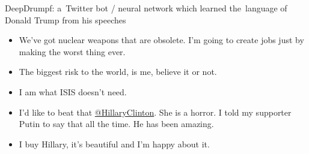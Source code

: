 \documentclass{beamer}
\begin{document}
  {

    \begin{frame}{DeepDrumpf: a~Twitter bot / neural network which learned the~language of Donald Trump from his speeches}
      \pause

      \vskip 5.25cm
      \begin{itemize}[<+- | alert@+>]
          \tiny
        \item We've got nuclear weapons that are obsolete.
          I'm going to create jobs just by making the worst thing ever.
        \item The biggest risk to the world, is me, believe it or not.
        \item I am what ISIS doesn't need.
        \item I'd like to beat that \href{https://twitter.com/hillaryclinton}{@HillaryClinton}.
          She is a horror.
          I told my supporter Putin to say that all the time.
          He has been amazing.
        \item I buy Hillary, it's beautiful and I'm happy about it.
      \end{itemize}
    \end{frame}
  }
\end{document}
